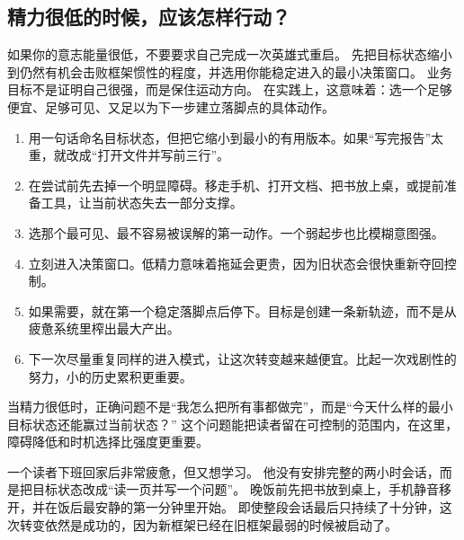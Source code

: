 \subsection{精力很低的时候，应该怎样行动？}

如果你的意志能量很低，不要要求自己完成一次英雄式重启。
先把目标状态缩小到仍然有机会击败框架惯性的程度，并选用你能稳定进入的最小决策窗口。
业务目标不是证明自己很强，而是保住运动方向。
在实践上，这意味着：选一个足够便宜、足够可见、又足以为下一步建立落脚点的具体动作。

\begin{enumerate}[nosep]
  \item 用一句话命名目标状态，但把它缩小到最小的有用版本。如果“写完报告”太重，就改成“打开文件并写前三行”。
  \item 在尝试前先去掉一个明显障碍。移走手机、打开文档、把书放上桌，或提前准备工具，让当前状态失去一部分支撑。
  \item 选那个最可见、最不容易被误解的第一动作。一个弱起步也比模糊意图强。
  \item 立刻进入决策窗口。低精力意味着拖延会更贵，因为旧状态会很快重新夺回控制。
  \item 如果需要，就在第一个稳定落脚点后停下。目标是创建一条新轨迹，而不是从疲惫系统里榨出最大产出。
  \item 下一次尽量重复同样的进入模式，让这次转变越来越便宜。比起一次戏剧性的努力，小的历史累积更重要。
\end{enumerate}

\begin{remark}[低精力规则]
当精力很低时，正确问题不是“我怎么把所有事都做完”，而是“今天什么样的最小目标状态还能赢过当前状态？”
这个问题能把读者留在可控制的范围内，在这里，障碍降低和时机选择比强度更重要。
\end{remark}

\begin{example}[疲惫的夜晚]
一个读者下班回家后非常疲惫，但又想学习。
他没有安排完整的两小时会话，而是把目标状态改成“读一页并写一个问题”。
晚饭前先把书放到桌上，手机静音移开，并在饭后最安静的第一分钟里开始。
即使整段会话最后只持续了十分钟，这次转变依然是成功的，因为新框架已经在旧框架最弱的时候被启动了。
\end{example}
